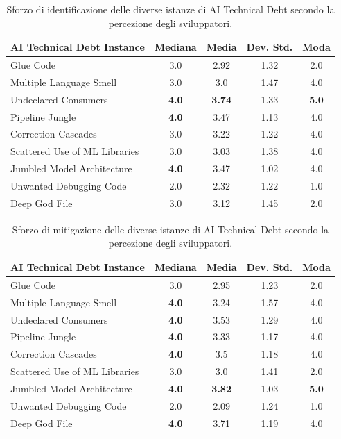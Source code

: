 \begin{table}[h!]
    \footnotesize
    \centering
    \begin{tabular}{|l|c|c|c|c|}
    \hline
    \textbf{AI Technical Debt Instance} & \textbf{Mediana} & \textbf{Media} & \textbf{Dev. Std.} & \textbf{Moda} \\
    \hline
    Glue Code & 3.0 & 2.92 & 1.32 & 2.0 \\
    Multiple Language Smell & 3.0 & 3.0 & 1.47 & 4.0 \\
    Undeclared Consumers & \textbf{4.0} & \textbf{3.74} & 1.33 & \textbf{5.0} \\
    Pipeline Jungle & \textbf{4.0} & 3.47 & 1.13 & 4.0 \\
    Correction Cascades & 3.0 & 3.22 & 1.22 & 4.0 \\
    Scattered Use of ML Libraries & 3.0 & 3.03 & 1.38 & 4.0 \\
    Jumbled Model Architecture & \textbf{4.0} & 3.47 & 1.02 & 4.0 \\
    Unwanted Debugging Code & 2.0 & 2.32 & 1.22 & 1.0 \\
    Deep God File & 3.0 & 3.12 & 1.45 & 2.0 \\
    \hline
    \end{tabular}
    \caption{Sforzo di identificazione delle diverse istanze di AI Technical Debt secondo la percezione degli sviluppatori.}
    \label{tab:id_effort_index}
\end{table}

\begin{table}[h!]
    \footnotesize
    \centering
    \begin{tabular}{|l|c|c|c|c|}
    \hline
    \textbf{AI Technical Debt Instance} & \textbf{Mediana} & \textbf{Media} & \textbf{Dev. Std.} & \textbf{Moda} \\
    \hline
    Glue Code & 3.0 & 2.95 & 1.23 & 2.0 \\
    Multiple Language Smell & \textbf{4.0} & 3.24 & 1.57 & 4.0 \\
    Undeclared Consumers & \textbf{4.0} & 3.53 & 1.29 & 4.0 \\
    Pipeline Jungle & \textbf{4.0} & 3.33 & 1.17 & 4.0 \\
    Correction Cascades & \textbf{4.0} & 3.5 & 1.18 & 4.0 \\
    Scattered Use of ML Libraries & 3.0 & 3.0 & 1.41 & 2.0 \\
    Jumbled Model Architecture & \textbf{4.0} & \textbf{3.82} & 1.03 & \textbf{5.0} \\
    Unwanted Debugging Code & 2.0 & 2.09 & 1.24 & 1.0 \\
    Deep God File & \textbf{4.0} & 3.71 & 1.19 & 4.0 \\
    \hline
    \end{tabular}
    \caption{Sforzo di mitigazione delle diverse istanze di AI Technical Debt secondo la percezione degli sviluppatori.}
    \label{tab:ref_effort_index}
\end{table}

